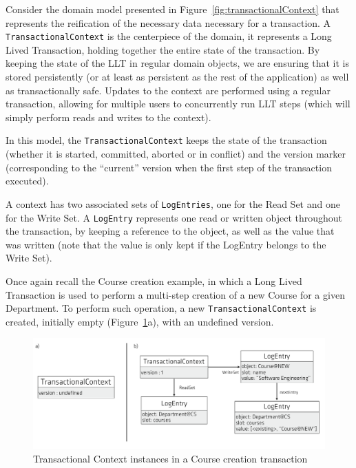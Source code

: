 Consider the domain model presented in
Figure~\ref{fig:transactionalContext} that represents the reification
of the necessary data necessary for a transaction. A
\texttt{TransactionalContext} is the centerpiece of the domain, it
represents a Long Lived Transaction, holding together the entire state
of the transaction. By keeping the state of the LLT in regular domain
objects, we are ensuring that it is stored persistently (or at least
as persistent as the rest of the application) as well as
transactionally safe. Updates to the context are performed using a
regular transaction, allowing for multiple users to concurrently run
LLT steps (which will simply perform reads and writes to the context).

In this model, the \texttt{TransactionalContext} keeps the state of
the transaction (whether it is started, committed, aborted or in
conflict) and the version marker (corresponding to the ``current''
version when the first step of the transaction executed).

A context has two associated sets of \texttt{LogEntries}, one for the
Read Set and one for the Write Set. A \texttt{LogEntry} represents one
read or written object throughout the transaction, by keeping a
reference to the object, as well as the value that was written (note
that the value is only kept if the LogEntry belongs to the Write Set).

Once again recall the Course creation example, in which a Long Lived
Transaction is used to perform a multi-step creation of a new Course
for a given Department. To perform such operation, a new
\texttt{TransactionalContext} is created, initially empty
(Figure~\ref{fig:course-logEntries}a), with an undefined version.

\begin{figure}
\centering
\includegraphics[width=1\linewidth]{log-entries}
\caption{Transactional Context instances in a Course creation transaction}
\label{fig:course-logEntries}
\end{figure}

